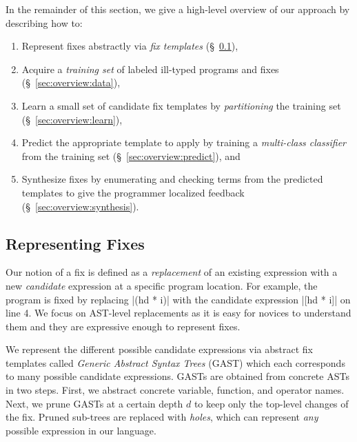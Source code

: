 In the remainder of this section, we give a high-level overview
of our approach by describing how to:

\begin{enumerate}

  \item Represent fixes abstractly via \emph{fix templates}
        (\S~\ref{sec:overview:templates}),

  \item Acquire a \emph{training set} of labeled ill-typed programs and fixes
        (\S~\ref{sec:overview:data}),

  \item Learn a small set of candidate fix templates by \emph{partitioning}
        the training set (\S~\ref{sec:overview:learn}),

  \item Predict the appropriate template to apply by training a
        \emph{multi-class classifier} from the training set
        (\S~\ref{sec:overview:predict}), and

  \item Synthesize fixes by enumerating and checking terms from the
        predicted templates to give the programmer localized feedback
        (\S~\ref{sec:overview:synthesis}).
\end{enumerate}

\subsection{Representing Fixes}
\label{sec:overview:templates}

Our notion of a fix is defined as a \emph{replacement} of an existing expression
with a new \emph{candidate} expression at a specific program location. For
example, the \mbd program is fixed by replacing |(hd * i)| with the candidate
expression |[hd * i]| on line 4. We focus on AST-level replacements as it is
easy for novices to understand them and they are expressive enough to represent
fixes.


%
We represent the different possible candidate expressions via abstract fix
templates called \emph{Generic Abstract Syntax Trees} (GAST) which each
corresponds to many possible candidate expressions.
%
GASTs are obtained from concrete ASTs in two steps.
%
First, we abstract concrete variable, function, and operator names.
%
Next, we prune GASTs at a certain depth $d$ to keep only the top-level changes
of the fix. Pruned sub-trees are replaced with \emph{holes}, which can represent
\emph{any} possible expression in our language.


